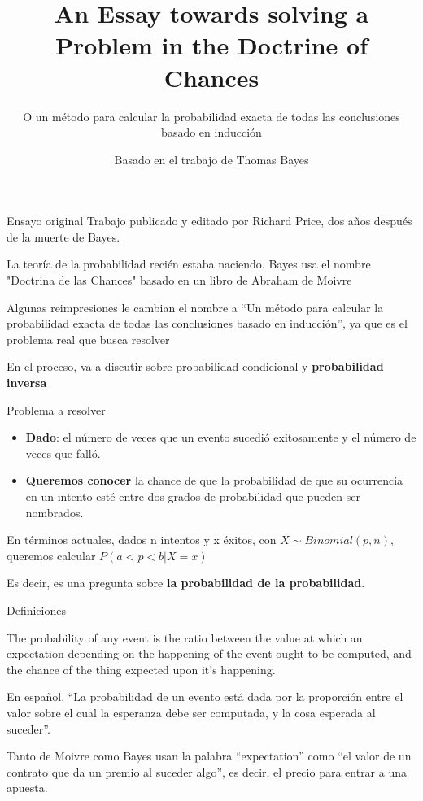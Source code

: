 \documentclass{beamer}
\title{An Essay towards solving a Problem in the Doctrine of Chances}
\subtitle{O un método para calcular la probabilidad exacta de todas las conclusiones basado en inducción}
\author{Basado en el trabajo de Thomas Bayes}
\begin{document}
\begin{frame}[plain]
    \maketitle
\end{frame}

\begin{frame}{Ensayo original}
	Trabajo publicado y editado por Richard Price, dos años después de la muerte de Bayes.

	La teoría de la probabilidad recién estaba naciendo.
	Bayes usa el nombre "Doctrina de las Chances" basado en un libro de Abraham de Moivre

	Algunas reimpresiones le cambian el nombre a ``Un método para calcular la probabilidad exacta de todas las conclusiones basado en inducción'', ya que es el problema real que busca resolver

	En el proceso, va a discutir sobre probabilidad condicional y \textbf{probabilidad inversa}
\end{frame}

\begin{frame}{Problema a resolver}
	\begin{itemize}
		\item \textbf{Dado}: el número de veces que un evento sucedió exitosamente y el número de veces que falló.
		\item \textbf{Queremos conocer} la chance de que la probabilidad de que su ocurrencia en un intento esté entre dos grados de probabilidad que pueden ser nombrados.
	\end{itemize}

	En términos actuales,
	dados n intentos y x éxitos, con $X \sim Binomial(p, n)$,
	queremos calcular $P(a < p < b | X = x)$

	Es decir, es una pregunta sobre \textbf{la probabilidad de la probabilidad}.
\end{frame}

\begin{frame}{Definiciones}
	\begin{displayquote}
		The probability of any event is the ratio between the value at which an expectation depending on the happening of the event ought to be computed, and the chance of the thing expected upon it’s happening.  
	\end{displayquote}

	En español, ``La probabilidad de un evento está dada por la proporción entre el valor sobre el cual la esperanza debe ser computada, y la cosa esperada al suceder''.

	Tanto de Moivre como Bayes usan la palabra ``expectation'' como ``el valor de un contrato que da un premio al suceder algo'', es decir, el precio para entrar a una apuesta.
\end{frame}
\end{document}
